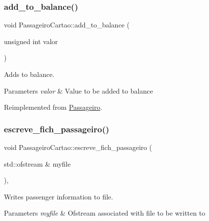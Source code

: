 \subsubsection{\texorpdfstring{add\+\_\+to\+\_\+balance()}{add\_to\_balance()}}
{\footnotesize\ttfamily void Passageiro\+Cartao\+::add\+\_\+to\+\_\+balance (\begin{DoxyParamCaption}\item[{unsigned int}]{valor }\end{DoxyParamCaption})\hspace{0.3cm}{\ttfamily [virtual]}}



Adds to balance. 


\begin{DoxyParams}{Parameters}
{\em valor} & Value to be added to balance \\
\hline
\end{DoxyParams}


Reimplemented from \hyperlink{class_passageiro_ac7da59960d323e9bc75dda2e34d7a254}{Passageiro}.

\mbox{\label{class_passageiro_cartao_a3c4167d97a0a71215970d7473f9629c1}} 
\subsubsection{\texorpdfstring{escreve\+\_\+fich\+\_\+passageiro()}{escreve\_fich\_passageiro()}}
{\footnotesize\ttfamily void Passageiro\+Cartao\+::escreve\+\_\+fich\+\_\+passageiro (\begin{DoxyParamCaption}\item[{std\+::ofstream \&}]{myfile }\end{DoxyParamCaption})\hspace{0.3cm}{\ttfamily [inline]}, {\ttfamily [virtual]}}



Writes passenger information to file. 


\begin{DoxyParams}{Parameters}
{\em myfile} & Ofstream associated with file to be written to \\
\hline
\end{DoxyParams}


